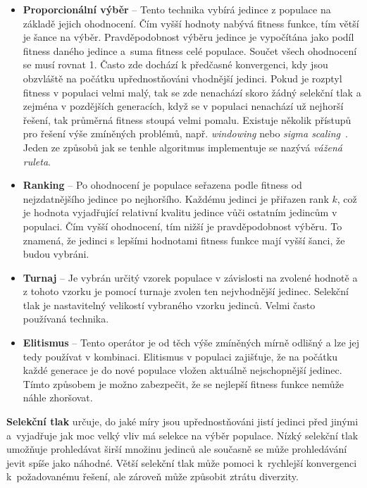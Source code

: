 \begin{itemize}
    \item \textbf{Proporcionální výběr} -- Tento technika vybírá jedince z populace na základě jejich ohodnocení. Čím vyšší hodnoty nabývá fitness funkce, tím větší je šance na výběr. Pravděpodobnost výběru jedince je vypočítána jako podíl fitness daného jedince a~suma fitness celé populace. Součet všech ohodnocení se musí rovnat 1. Často zde dochází k předčasné konvergenci, kdy jsou obzvláště na počátku upřednostňováni vhodnější jedinci. Pokud je rozptyl fitness v populaci velmi malý, tak se zde nenachází skoro žádný selekční tlak a zejména v pozdějších generacích, když se v populaci nenachází už nejhorší řešení, tak průměrná fitness stoupá velmi pomalu. Existuje několik přístupů pro řešení výše zmíněných problémů, např. \emph{windowing} nebo \emph{sigma scaling}~\cite[str. 81]{eiben-2015B}. Jeden ze způsobů jak se tenhle algoritmus implementuje se nazývá \emph{vážená ruleta}.
    \item \textbf{Ranking} -- Po ohodnocení je populace seřazena podle fitness od nejzdatnějšího jedince po nejhoršího. Každému jedinci je přiřazen rank $k$, což je hodnota vyjadřující relativní kvalitu jedince vůči ostatním jedincům v populaci. Čím vyšší ohodnocení, tím nižší je pravděpodobnost výběru. To znamená, že jedinci s lepšími hodnotami fitness funkce  mají vyšší šanci, že budou vybráni.
    \item \textbf{Turnaj} -- Je vybrán určitý vzorek populace v závislosti na zvolené hodnotě a z tohoto vzorku je pomocí turnaje zvolen ten nejvhodnější jedinec. Selekční tlak je nastavitelný velikostí vybraného vzorku jedinců. Velmi často používaná technika.
    \item \textbf{Elitismus} -- Tento operátor je od těch výše zmíněných mírně odlišný a lze jej tedy používat v kombinaci. Elitismus v populaci zajišťuje, že na počátku každé generace je do nové populace vložen aktuálně nejschopnější jedinec. Tímto způsobem je možno zabezpečit, že se nejlepší fitness funkce nemůže náhle zhoršovat. 
\end{itemize}

\textbf{Selekční tlak} určuje, do jaké míry jsou upřednostňováni jistí jedinci před jinými a~vyjadřuje jak moc velký vliv má selekce na výběr populace. Nízký selekční tlak umožňuje prohledávat širší množinu jedinců ale současně se může prohledávání jevit spíše jako náhodné. Větší selekční tlak může pomoci k~rychlejší konvergenci k~požadovanému řešení, ale zároveň  může způsobit ztrátu diverzity. 

